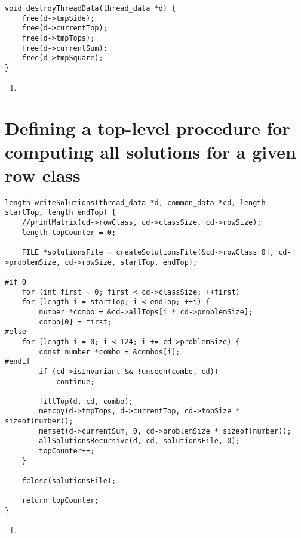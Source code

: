 \begin{lstlisting}[caption={},label={destroyThreadData}]
void destroyThreadData(thread_data *d) {
    free(d->tmpSide);
    free(d->currentTop);
    free(d->tmpTops);
    free(d->currentSum);
    free(d->tmpSquare);
}
\end{lstlisting}

\begin{enumerate}
\addtocounter{enumi}{1}
\item 
\end{enumerate}

\section{Defining a top-level procedure for computing all solutions for a given row class}

\begin{lstlisting}[caption={},label={writeSolutions}]
length writeSolutions(thread_data *d, common_data *cd, length startTop, length endTop) {
    //printMatrix(cd->rowClass, cd->classSize, cd->rowSize);
    length topCounter = 0;

    FILE *solutionsFile = createSolutionsFile(&cd->rowClass[0], cd->problemSize, cd->rowSize, startTop, endTop);

#if 0
    for (int first = 0; first < cd->classSize; ++first)
    for (length i = startTop; i < endTop; ++i) {
        number *combo = &cd->allTops[i * cd->problemSize];
        combo[0] = first;
#else
    for (length i = 0; i < 124; i += cd->problemSize) {
        const number *combo = &combos[i];
#endif
        if (cd->isInvariant && !unseen(combo, cd))
            continue;

        fillTop(d, cd, combo);
        memcpy(d->tmpTops, d->currentTop, cd->topSize * sizeof(number));
        memset(d->currentSum, 0, cd->problemSize * sizeof(number));
        allSolutionsRecursive(d, cd, solutionsFile, 0);
        topCounter++;
    }

    fclose(solutionsFile);

    return topCounter;
}
\end{lstlisting}

\begin{enumerate}
\addtocounter{enumi}{1}
\item 
\end{enumerate}
